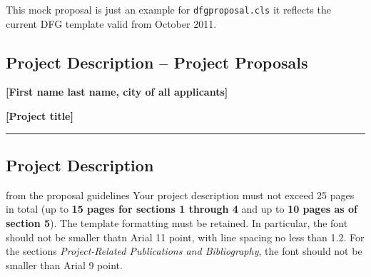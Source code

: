 \documentclass[    %
    gitinfo,       %
    noworkareas,   %
    RAM,           %
    general,       %
    \classoptions] %
    {dfgproposal}
\begin{document}
\begin{center}\color{red}\huge
  This mock proposal is just an example for \texttt{dfgproposal.cls} it reflects the 
  current DFG template valid from October 2011.
\end{center}

\begin{proposal}[
  PI=miko,
  mikoname=Michael Kohlhase,
  mikoaffiliation=FAU Erlangen N\"urnberg,
  mikodept=Computer Science,
  mikotitle=Prof. Dr., 
  pubspage=mikopubs,
  thema=Intelligentes Schreiben von Antr\"agen,
  acronym={iPoWr},
  acrolong={\underline{I}ntelligent} {\underline{P}r\underline{o}posal} {\underline{Wr}iting},
  title=\pn: \protect\pnlong,
  totalduration=3 years,
  start=1. Feb. 2010,
  months=24,
  RM=36,RAM=36,
  discipline=Computer Science, 
  areas=Knowledge Management,
  keywords={LaTeX Active Documents}]




\section*{Project Description -- Project Proposals}

\textbf{[First name last name, city of all applicants]}

\noindent\textbf{[Project title]}

\noindent\rule{\textwidth}{.5pt}

\subsection*{Project Description}

\begin{todo}{from the proposal guidelines}
	Your project description must not exceed 25 pages in total (up to \textbf{15 pages for sections 1 through 4} and up to \textbf{10 pages as of section 5}). The template formatting must be retained. In particular, the font should not be smaller thatn Arial 11 point, with line spacing no less than 1.2. For the sections \emph{Project-Related Publications and Bibliography}, the font should not be smaller than Arial 9 point.
\end{todo}


\end{proposal}
\end{document}
